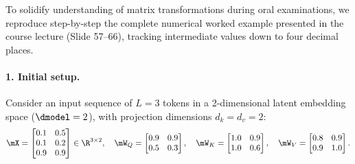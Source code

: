 \documentclass[../../main.tex]{subfiles}
\begin{document}
\begin{examinsight}
To solidify understanding of matrix transformations during oral examinations, we reproduce step-by-step the complete numerical worked example presented in the course lecture (Slide 57--66), tracking intermediate values down to four decimal places.

\paragraph{1. Initial setup.}
Consider an input sequence of $L = 3$ tokens in a 2-dimensional latent embedding space ($\dmodel = 2$), with projection dimensions $d_k = d_v = 2$:
\begin{equation}
\mX = \begin{bmatrix}
0.1 & 0.5 \\
0.1 & 0.2 \\
0.9 & 0.9
\end{bmatrix} \in \R^{3 \times 2}, \quad
\mW_Q = \begin{bmatrix}
0.9 & 0.9 \\
0.5 & 0.3
\end{bmatrix}, \quad
\mW_K = \begin{bmatrix}
1.0 & 0.9 \\
1.0 & 0.6
\end{bmatrix}, \quad
\mW_V = \begin{bmatrix}
0.8 & 0.9 \\
0.9 & 1.0
\end{bmatrix}.
\end{equation}


\end{examinsight}
\end{document}
